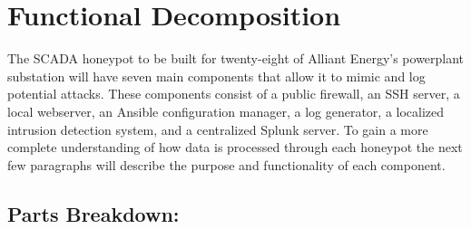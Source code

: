 \section{Functional Decomposition}

The SCADA honeypot to be built for twenty-eight of Alliant Energy's powerplant substation will have seven main components that allow it to mimic and log potential attacks.  These components consist of a public firewall, an SSH server, a local webserver, an Ansible configuration manager, a log generator, a localized intrusion detection system, and a centralized Splunk server.  To gain a more complete understanding of how data is processed through each honeypot the next few paragraphs will describe the purpose and functionality of each component.

\subsection{Parts Breakdown:}
